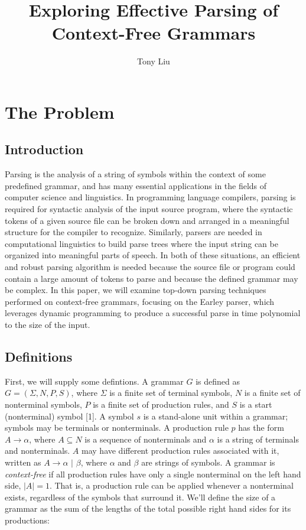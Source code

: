 \documentclass[a4paper, 11pt]{article}
\begin{document}
\title{Exploring Effective Parsing of Context-Free Grammars}
\author{Tony Liu}
\maketitle

\section{The Problem}

\subsection{Introduction}
Parsing is the analysis of a string of symbols within the context of some predefined grammar, and has many essential applications in the fields of computer science 
and linguistics. In programming language compilers, parsing is required for syntactic analysis of the input source program, where the syntactic tokens of a given
source file can be broken down and arranged in a meaningful structure for the compiler to recognize. Similarly, parsers are needed in computational linguistics 
to build parse trees where the input string can be organized into meaningful parts of speech. In both of these situations, an efficient and robust parsing algorithm is needed 
because the source file or program could contain a large amount of tokens to parse and because the defined grammar may be complex. In this paper, we will examine top-down
parsing techniques performed on context-free grammars, focusing on the Earley parser, which leverages dynamic programming to produce a successful parse in time polynomial
to the size of the input.

\subsection{Definitions}
First, we will supply some defintions. A grammar $G$ is defined as $G = ( \Sigma, N, P, S)$, where $\Sigma$ is a finite set of terminal symbols, $N$ is a finite set of 
nonterminal symbols, $P$ is a finite set of production rules, and $S$ is a start (nonterminal) symbol [1]. A symbol $s$ is a stand-alone unit within a grammar; symbols may be
terminals or nonterminals. A production rule $p$ has the form $A \to \alpha$, where $A \subseteq N$ is a sequence of nonterminals and $\alpha$ is a string of terminals and 
nonterminals. $A$ may have different production rules associated with it, written as $A \to \alpha$ $|$ $\beta$, where $\alpha$ and $\beta$ are strings of symbols. A grammar 
is 
\textit{context-free} if all production rules have only a single nonterminal on the left hand side, $|A| = 1$. That is, a production rule can be applied whenever a 
nonterminal exists, regardless of the symbols that surround it. We'll define the size of a grammar as the sum of the lengths of the total possible right hand sides for 
its productions:
\end{document}
